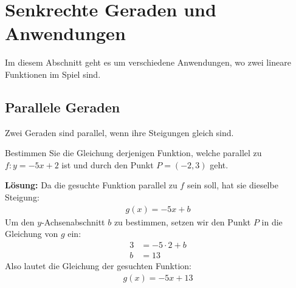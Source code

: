 \section{Senkrechte Geraden und Anwendungen}
Im diesem Abschnitt geht es um verschiedene Anwendungen, wo zwei lineare Funktionen im Spiel sind.
\subsection{Parallele Geraden}
\begin{fazit}[]{}
    Zwei Geraden sind parallel, wenn ihre Steigungen gleich sind.
\end{fazit}
\begin{example}
    Bestimmen Sie die Gleichung derjenigen Funktion, welche parallel zu $f:y=-5x+2$ ist und durch den Punkt $P=(-2,3)$ geht.\\
    \bigskip

    \textbf{Lösung:} Da die gesuchte Funktion parallel zu $f$ sein soll, hat sie dieselbe Steigung:
    \begin{align*}
        g(x) = -5x + b
    \end{align*}
    Um den $y$-Achsenabschnitt $b$ zu bestimmen, setzen wir den Punkt $P$ in die Gleichung von $g$ ein:
    \begin{align*}
        3 & = -5\cdot 2 + b \\
        b & = 13
    \end{align*}
    Also lautet die Gleichung der gesuchten Funktion:
    \begin{align*}
        g(x) = -5x + 13
    \end{align*}
\end{example}
\newpage

